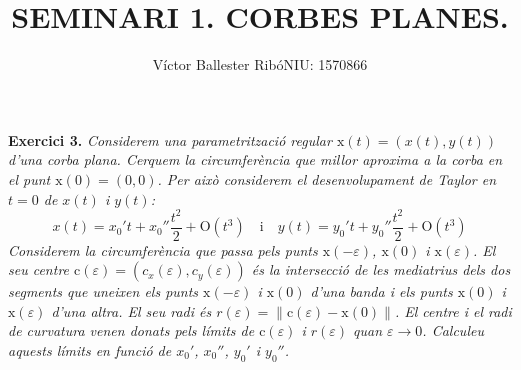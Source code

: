 \documentclass[10pt,a4paper]{article}
\title{\bfseries\large SEMINARI 1. CORBES PLANES.}
\author{Víctor Ballester Ribó\endgraf NIU: 1570866}
\date{\parbox{\linewidth}{\centering
  Geometria diferencial\endgraf
  Grau en Matemàtiques\endgraf
  Universitat Autònoma de Barcelona\endgraf
  Febrer de 2022}}
\newcommand{\vf}[1]{\boldsymbol{\mathrm{#1}}} %
\theoremstyle{definition}
\renewcommand{\O}[1]{\mathrm{O}\left(#1\right)}
\begin{document}
\maketitle
\textbf{Exercici 3.}
\textit{Considerem una parametrització regular $\vf{x}(t) = (x(t),y(t))$ d'una corba plana. Cerquem la circumferència que millor aproxima a la corba en el punt $\vf{x}(0) = (0,0)$.  Per això considerem el desenvolupament de Taylor en $t= 0$ de $x(t)$ i $y(t)$:
  \begin{equation}\label{taylor}
    x(t) =x_0't+x_0''\frac{t^2}{2}+\O{t^3}\quad\text{i}\quad y(t) =y_0't+y_0''\frac{t^2}{2}+\O{t^3}
  \end{equation}
  Considerem la circumferència que passa pels punts $\vf{x}(-\varepsilon)$, $\vf{x}(0)$ i $\vf{x}(\varepsilon)$. El seu centre $\vf{c}(\varepsilon) =(c_x(\varepsilon),c_y(\varepsilon))$ és la intersecció de les mediatrius dels dos segments que uneixen els punts $\vf{x}(-\varepsilon)$ i $\vf{x}(0)$ d'una banda i els punts $\vf{x}(0)$ i $\vf{x}(\varepsilon)$ d'una altra. El seu radi és $r(\varepsilon) =\|\vf{c}(\varepsilon)-\vf{x}(0)\|$. El centre i el radi de curvatura venen donats pels límits de $\vf{c}(\varepsilon)$ i $r(\varepsilon)$ quan $\varepsilon\to 0$. Calculeu aquests límits en funció de $x_0'$, $x_0''$, $y_0'$ i $y_0''$.}
\vspace{0.5cm}
\end{document}
